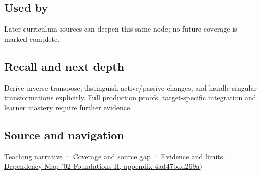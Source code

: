 \subsection{Used by}\label{appendix-46da295c6787-used-by}

Later curriculum sources can deepen this same node; no future coverage is marked complete.

\subsection{Recall and next depth}\label{appendix-46da295c6787-recall-and-next-depth}

Derive inverse transpose, distinguish active/passive changes, and handle singular transformations explicitly. Full production proofs, target-specific integration and learner mastery require further evidence.

\subsection{Source and navigation}\label{appendix-46da295c6787-source-and-navigation}

\hyperref[01-foundations-i-ch018-a-normal-is-a-measuring-rule-before-it-is-an-arrow]{Teaching narrative} · \hyperref[appendix-fd090d982a15-phase-6---parts-501-600]{Coverage and source gap} · \hyperref[appendix-a103e7846d21-phase-6---source-analysis-and-verification]{Evidence and limits} · \href{../02-Foundations-II/main.pdf\#nameddest=appendix-4ad47bdd269a}{Dependency Map (02-Foundations-II, appendix-4ad47bdd269a)}
